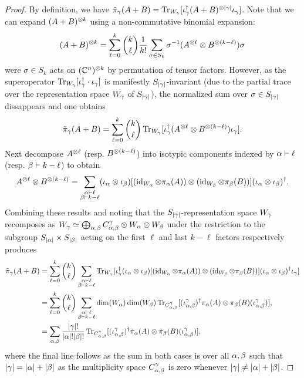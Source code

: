 \documentclass[notitlepage, 10pt]{article}
\begin{document}
\begin{proof}
    By definition, we have $\tilde \pi_{\gamma}(A+B) = \operatorname{Tr}_{W_{\gamma}}[\iota_{\gamma}^{\dagger} (A+B)^{\otimes {|\gamma|}} \iota_{\gamma}]$. 
    Note that we can expand $(A+B)^{\otimes k}$ using a non-commutative binomial expansion:
    \begin{equation}
        (A+B)^{\otimes k} = \sum_{\ell=0}^{k} \binom{k}{\ell}  \frac{1}{k!} \sum_{\sigma \in S_{k}} \sigma^{-1} (A^{\otimes \ell} \otimes B^{\otimes (k - \ell)})\sigma
    \end{equation}
    were $\sigma \in S_{k}$ acts on $(\mathbb C^{n})^{\otimes k}$ by permutation of tensor factors.
    However, as the superoperator $\operatorname{Tr}_{W_{\gamma}}[\iota_{\gamma}^{\dagger} \cdot \iota_{\gamma}]$ is manifestly $S_{{|\gamma|}}$-invariant (due to the partial trace over the representation space $W_{\gamma}$ of $S_{{|\gamma|}}$), the normalized sum over $\sigma \in S_{{|\gamma|}}$ dissappears and one obtains
    \begin{equation}
        \tilde \pi_{\gamma}(A+B) = \sum_{\ell=0}^{k} \binom{k}{\ell} \operatorname{Tr}_{W_{\gamma}}[\iota_{\gamma}^{\dagger} (A^{\otimes \ell} \otimes B^{\otimes (k - \ell)}) \iota_{\gamma}].
    \end{equation}
    Next decompose $A^{\otimes \ell}$ (resp. $B^{\otimes (k - \ell)}$) into isotypic components indexed by $\alpha \vdash \ell$ (resp. $\beta \vdash k - \ell$) to obtain
    \begin{equation}
        A^{\otimes \ell} \otimes B^{\otimes (k - \ell)} = \sum_{\substack{\alpha\vdash \ell\\\beta\vdash k -\ell}} (\iota_{\alpha} \otimes \iota_{\beta}) [(\operatorname{id}_{W_{\alpha}} \otimes \pi_{\alpha}(A))\otimes(\operatorname{id}_{W_{\beta}} \otimes \pi_{\beta}(B))] (\iota_{\alpha} \otimes \iota_{\beta})^{\dagger}.
    \end{equation}
    Combining these results and noting that the $S_{{|\gamma|}}$-representation space $W_{\gamma}$ recomposes as $W_{\gamma} \simeq \bigoplus_{\alpha,\beta} C^{\gamma}_{\alpha,\beta} \otimes W_{\alpha} \otimes W_{\beta}$ under the restriction to the subgroup $S_{{|\alpha|}} \times S_{{|\beta|}}$ acting on the first $\ell$ and last $k-\ell$ factors respectively produces
    \begin{align}
        \tilde \pi_{\gamma}(A+B) 
        &= \sum_{\ell=0}^{k} \binom{k}{\ell} \sum_{\substack{\alpha\vdash \ell\\\beta\vdash k -\ell}} \operatorname{Tr}_{W_{\gamma}}[\iota_{\gamma}^{\dagger} (\iota_{\alpha} \otimes \iota_{\beta}) [(\operatorname{id}_{W_{\alpha}} \otimes \pi_{\alpha}(A))\otimes(\operatorname{id}_{W_{\beta}} \otimes \pi_{\beta}(B))] (\iota_{\alpha} \otimes \iota_{\beta})^{\dagger} \iota_{\gamma}] \\
        &= \sum_{\ell=0}^{k} \binom{k}{\ell} \sum_{\substack{\alpha\vdash \ell\\\beta\vdash k -\ell}} \dim(W_\alpha)\dim(W_\beta) \operatorname{Tr}_{C^{\gamma}_{\alpha,\beta}} [ (\iota^{\gamma}_{\alpha,\beta})^{\dagger} \pi_\alpha(A) \otimes \pi_\beta(B) (\iota^{\gamma}_{\alpha,\beta})], \\
        &= \sum_{\alpha,\beta} \frac{{|\gamma|}!}{{|\alpha|}!{|\beta|}!} \operatorname{Tr}_{C^{\gamma}_{\alpha,\beta}} [ (\iota^{\gamma}_{\alpha,\beta})^{\dagger} \tilde \pi_\alpha(A) \otimes \tilde \pi_\beta(B) (\iota^{\gamma}_{\alpha,\beta})],
    \end{align}
    where the final line follows as the sum in both cases is over all $\alpha,\beta$ such that ${|\gamma|} = {|\alpha|}+{|\beta|}$ as the multiplicity space $C^{\gamma}_{\alpha,\beta}$ is zero whenever ${|\gamma|} \neq {|\alpha|}+{|\beta|}$.
\end{proof}
\end{document}
